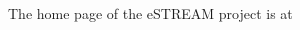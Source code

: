 \documentclass[letterpaper,12pt]{article}
\begin{document}
\begin{thebibliography}{99}




\begin{samepage}
  The home page of the eSTREAM project is at\newline
\end{samepage}



\end{thebibliography}
\end{document}
